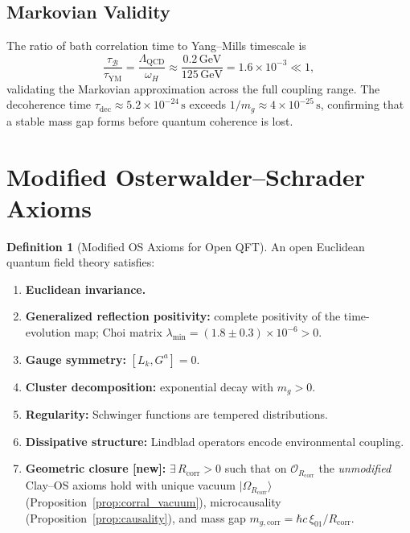 \documentclass[12pt,a4paper]{article}
\theoremstyle{definition}
\newtheorem{definition}[theorem]{Definition}
\newcommand{\GeV}{\,\mathrm{GeV}}
\newcommand{\YM}{\mathrm{YM}}
\newcommand{\mgcorr}{m_{g,\mathrm{corr}}}
\newcommand{\Rcorr}{R_{\mathrm{corr}}}
\newcommand{\bath}{\mathcal{B}}
\begin{document}
\subsection{Markovian Validity}

The ratio of bath correlation time to Yang--Mills timescale is
\begin{equation}
  \frac{\tau_{\bath}}{\tau_{\YM}}
  = \frac{\Lambda_{\mathrm{QCD}}}{\omega_{H}}
  \approx \frac{0.2\GeV}{125\GeV}
  = 1.6 \times 10^{-3} \ll 1,
\end{equation}
validating the Markovian approximation across the full coupling range.
The decoherence time $\tau_{\mathrm{dec}} \approx 5.2 \times
10^{-24}\,\mathrm{s}$ exceeds $1/m_{g} \approx 4 \times 10^{-25}
\,\mathrm{s}$, confirming that a stable mass gap forms before quantum
coherence is lost.

\section{Modified Osterwalder--Schrader Axioms}
\label{sec:axioms}

\begin{definition}[Modified OS Axioms for Open QFT]
An open Euclidean quantum field theory satisfies:
\begin{enumerate}
  \item \textbf{Euclidean invariance.}
  \item \textbf{Generalized reflection positivity:} complete positivity
        of the time-evolution map; Choi matrix $\lambda_{\min} =
        (1.8 \pm 0.3) \times 10^{-6} > 0$.
  \item \textbf{Gauge symmetry:} $[L_{k}, G^{a}] = 0$.
  \item \textbf{Cluster decomposition:} exponential decay with $m_{g} > 0$.
  \item \textbf{Regularity:} Schwinger functions are tempered distributions.
  \item \textbf{Dissipative structure:} Lindblad operators encode
        environmental coupling.
  \item \textbf{Geometric closure [new]:} $\exists\,\Rcorr > 0$ such that
        on $\mathcal{O}_{\Rcorr}$ the \emph{unmodified} Clay--OS axioms
        hold with unique vacuum $|\Omega_{\Rcorr}\rangle$
        (Proposition~\ref{prop:corral_vacuum}), microcausality
        (Proposition~\ref{prop:causality}), and mass gap
        $\mgcorr = \hbar c\,\xi_{01}/\Rcorr$.
\end{enumerate}
\end{definition}
\end{document}
